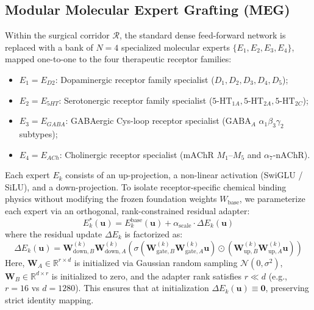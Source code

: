 \documentclass{article}
\theoremstyle{definition}
\begin{document}
\subsection{Modular Molecular Expert Grafting (MEG)}
Within the surgical corridor $\mathcal{R}$, the standard dense feed-forward network is replaced with a bank of $N = 4$ specialized molecular experts $\{E_1, E_2, E_3, E_4\}$, mapped one-to-one to the four therapeutic receptor families:
\begin{itemize}[leftmargin=1.5em,noitemsep]
    \item $E_1 = E_{D2}$: Dopaminergic receptor family specialist ($D_1, D_2, D_3, D_4, D_5$);
    \item $E_2 = E_{5HT}$: Serotonergic receptor family specialist ($5\text{-HT}_{1A}, 5\text{-HT}_{2A}, 5\text{-HT}_{2C}$);
    \item $E_3 = E_{GABA}$: GABAergic Cys-loop receptor specialist ($\text{GABA}_A$ $\alpha_1\beta_3\gamma_2$ subtypes);
    \item $E_4 = E_{ACh}$: Cholinergic receptor specialist ($\text{mAChR } M_1\text{--}M_5$ and $\alpha_7\text{-nAChR}$).
\end{itemize}

Each expert $E_k$ consists of an up-projection, a non-linear activation (SwiGLU / SiLU), and a down-projection. To isolate receptor-specific chemical binding physics without modifying the frozen foundation weights $W_{\text{base}}$, we parameterize each expert via an orthogonal, rank-constrained residual adapter:
\begin{equation}
E_k^*(\mathbf{u}) = E_k^{\text{base}}(\mathbf{u}) + \alpha_{\text{scale}} \cdot \Delta E_k(\mathbf{u})
\end{equation}
where the residual update $\Delta E_k$ is factorized as:
\begin{equation}
\Delta E_k(\mathbf{u}) = \mathbf{W}_{\text{down}, B}^{(k)} \mathbf{W}_{\text{down}, A}^{(k)} \left( \sigma\left(\mathbf{W}_{\text{gate}, B}^{(k)} \mathbf{W}_{\text{gate}, A}^{(k)} \mathbf{u}\right) \odot \left(\mathbf{W}_{\text{up}, B}^{(k)} \mathbf{W}_{\text{up}, A}^{(k)} \mathbf{u}\right) \right)
\label{eq:expert_lora}
\end{equation}
Here, $\mathbf{W}_A \in \mathbb{R}^{r \times d}$ is initialized via Gaussian random sampling $\mathcal{N}(0, \sigma^2)$, $\mathbf{W}_B \in \mathbb{R}^{d \times r}$ is initialized to zero, and the adapter rank satisfies $r \ll d$ (e.g., $r = 16$ vs $d = 1280$). This ensures that at initialization $\Delta E_k(\mathbf{u}) \equiv \mathbf{0}$, preserving strict identity mapping.
\end{document}
